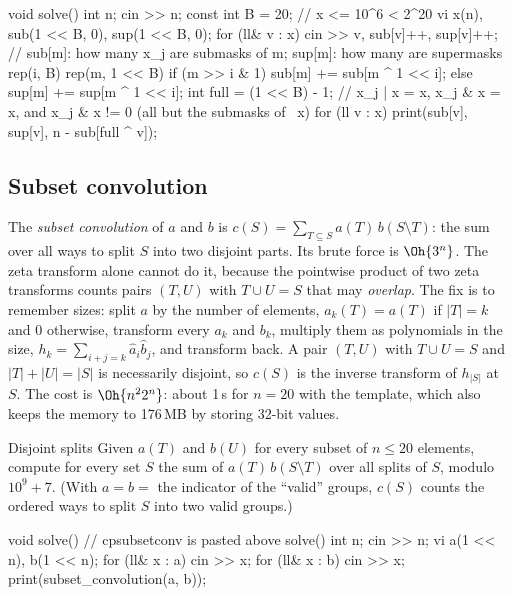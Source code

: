 \begin{code}
void solve() {
    int n;
    cin >> n;
    const int B = 20;  // x <= 10^6 < 2^20
    vi x(n), sub(1 << B, 0), sup(1 << B, 0);
    for (ll& v : x) cin >> v, sub[v]++, sup[v]++;
    // sub[m]: how many x_j are submasks of m; sup[m]: how many are supermasks
    rep(i, B) rep(m, 1 << B) {
        if (m >> i & 1) sub[m] += sub[m ^ 1 << i];
        else sup[m] += sup[m ^ 1 << i];
    }
    int full = (1 << B) - 1;
    // x_j | x = x, x_j & x = x, and x_j & x != 0 (all but the submasks of ~x)
    for (ll v : x) print(sub[v], sup[v], n - sub[full ^ v]);
}
\end{code}


\subsection{Subset convolution}

The \emph{subset convolution} of $a$ and $b$ is $c(S) = \sum_{T \subseteq S} a(T)\, b(S \setminus T)$: the sum over all ways to split
$S$ into two disjoint parts. Its brute force is $\Oh{3^n}$. The zeta transform alone cannot do it, because the pointwise product of
two zeta transforms counts pairs $(T, U)$ with $T \cup U = S$ that may \emph{overlap}. The fix is to remember sizes: split $a$ by the
number of elements, $a_k(T) = a(T)$ if $|T| = k$ and 0 otherwise, transform every $a_k$ and $b_k$, multiply them as polynomials in
the size, $h_k = \sum_{i + j = k} \hat a_i \hat b_j$, and transform back. A pair $(T, U)$ with $T \cup U = S$ and $|T| + |U| = |S|$
is necessarily disjoint, so $c(S)$ is the inverse transform of $h_{|S|}$ at $S$. The cost is $\Oh{n^2 2^n}$: about 1\,s for $n =
20$ with the template, which also keeps the memory to 176\,MB by storing 32-bit values.

\begin{problem}{Disjoint splits}
Given $a(T)$ and $b(U)$ for every subset of $n \le 20$ elements, compute for every set $S$ the sum of $a(T)\,b(S \setminus T)$ over all
splits of $S$, modulo $10^9 + 7$. (With $a = b = $ the indicator of the ``valid'' groups, $c(S)$ counts the ordered ways to split $S$
into two valid groups.)
\end{problem}

\begin{code}
void solve() {  // cpsubsetconv is pasted above solve()
    int n;
    cin >> n;
    vi a(1 << n), b(1 << n);
    for (ll& x : a) cin >> x;
    for (ll& x : b) cin >> x;
    print(subset_convolution(a, b));
}
\end{code}

